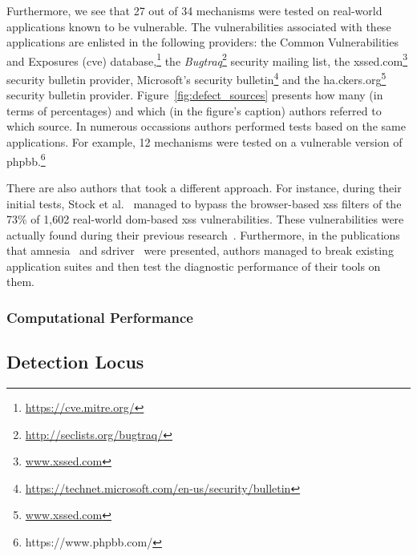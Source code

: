 \documentclass[conference]{IEEEtran}
\begin{document}
Furthermore, we see that 27 out of
34 mechanisms were tested on real-world applications
known to be vulnerable. The vulnerabilities
associated with these applications are enlisted
in the following providers: the Common Vulnerabilities
and Exposures ({\sc cve})
database,\footnote{\url{https://cve.mitre.org/}}
the {\it Bugtraq}\footnote{\url{http://seclists.org/bugtraq/}}
security mailing list, the
{\sc xss}ed.com\footnote{\url{www.xssed.com}}
security bulletin provider, Microsoft's security
bulletin\footnote{\url{https://technet.microsoft.com/en-us/security/bulletin}}
and the ha.ckers.org\footnote{\url{www.xssed.com}}
security bulletin provider. Figure~\ref{fig:defect_sources}
presents how many (in terms of percentages) and which
(in the figure's caption) authors referred to which source.
In numerous occassions authors performed tests based
on the same applications. For example, 12 mechanisms
were tested on a vulnerable version of
{\sc phpbb}.\footnote{https://www.phpbb.com/}

There are also authors that took a different approach.
For instance, during their initial tests,
Stock et al.~\cite{SLMS14} managed to bypass
the browser-based {\sc xss} filters of the
73\% of 1,602 real-world {\sc dom}-based {\sc xss} vulnerabilities.
These vulnerabilities were actually found during
their previous research~\cite{LSJ13}.
Furthermore, in the publications that
{\sc amnesia}~\cite{HO05,HO06,HO05b}
and {\sc sd}river~\cite{MS09,MKS09,MKLS11} were presented,
authors managed to break existing application suites
and then test the diagnostic performance of their tools on them.




\subsubsection{Computational Performance}

\subsection{Detection Locus}
\end{document}
